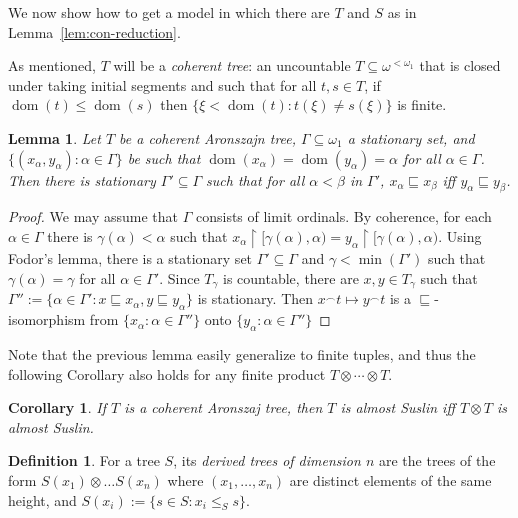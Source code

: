 \documentclass{amsart}
\newtheorem{corollary}[theorem]{Corollary}
\newtheorem{lemma}[theorem]{Lemma}
\theoremstyle{definition}
\newtheorem{definition}[theorem]{Definition}
\newcommand{\seb}{\subseteq}
\newcommand{\tleq}{\sqsubseteq}
\newcommand{\res}{\restriction}
\DeclareMathOperator{\dom}{dom}
\begin{document}
We now show how to get a model in which there are $T$ and $S$
as in Lemma~\ref{lem:con-reduction}.

As mentioned, $T$ will be
a \emph{coherent tree}: an uncountable $T \seb
\omega^{<\omega_{1}}$ that is closed under taking initial segments and
such that for all $t,s \in T$, if $\dom(t) \le \dom(s)$ then $\{\xi <
\dom(t) : t(\xi) \neq s(\xi)\}$ is finite.

\begin{lemma}\label{lem:antichains}
  Let $T$ be a coherent Aronszajn tree,
  $\Gamma \seb \omega_{1}$ a stationary set, and
  $\{(x_{\alpha},y_{\alpha}) :\alpha \in \Gamma\}$ be such that
  $\dom(x_{\alpha}) = \dom(y_{\alpha}) = \alpha$
  for all $\alpha \in \Gamma$. Then there is stationary $\Gamma' \seb \Gamma$
  such that for all $\alpha < \beta$ in $\Gamma'$,
  $x_{\alpha} \tleq x_{\beta}$ iff $y_{\alpha} \tleq y_{\beta}$.
\end{lemma}
\begin{proof}
  We may assume that $\Gamma$ consists of limit ordinals.
  By coherence, for each $\alpha \in \Gamma$ there is
  $\gamma(\alpha) < \alpha$ such that
  $x_{\alpha} \res [\gamma(\alpha),\alpha) =
  y_{\alpha} \res [\gamma(\alpha),\alpha)$.
  Using Fodor's lemma, there
  is a stationary set $\Gamma' \seb \Gamma$ and
  $\gamma < \min(\Gamma')$ such that $\gamma(\alpha) = \gamma$ for
  all $\alpha \in \Gamma'$. Since $T_{\gamma}$ is countable,
  there are $x,y \in T_{\gamma}$ such that
  $\Gamma'' :=\{\alpha \in \Gamma' : x \tleq x_{\alpha}, y \tleq y_{\alpha}\}$
  is stationary. Then $x^{\frown}t \mapsto y^{\frown}t$ is a $\tleq$-isomorphism
  from $\{x_{\alpha} : \alpha \in \Gamma''\}$ onto
  $\{y_{\alpha} : \alpha \in \Gamma''\}$
\end{proof}

Note that the previous lemma
easily generalize to  finite tuples,
and thus the following Corollary also holds for any finite product $T
\otimes \cdots \otimes T$.

\begin{corollary}\label{cor:coherent-asuslin}
  If $T$ is a coherent Aronszaj tree, then
  $T$ is almost Suslin iff $T\otimes T$ is almost Suslin.
\end{corollary}

\begin{definition}
  For a tree $S$, its \emph{derived trees of dimension $n$}
  are the trees of the form $S(x_{1}) \otimes
  \dots S(x_{n})$ where $(x_{1},\dots,x_{n})$ are distinct elements of
  the same height, and $S(x_{i}) := \{s \in S : x_{i} \le_{S} s\}$.
\end{definition}
\end{document}
